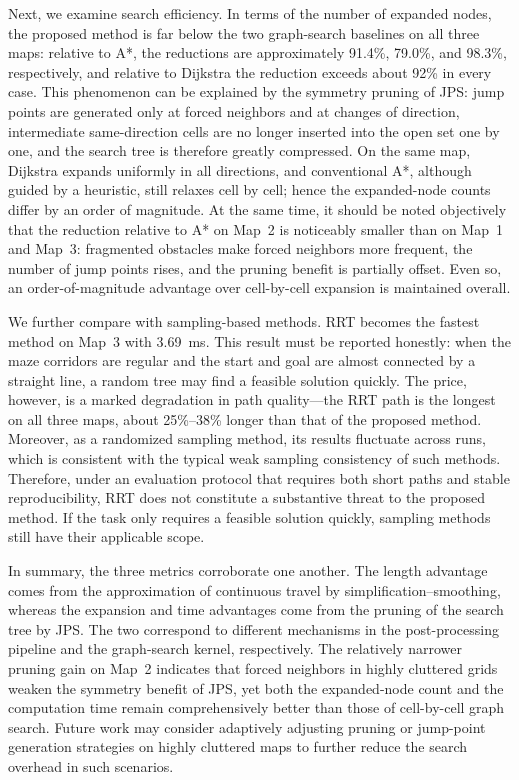 \documentclass[pdflatex,sn-basic,Numbered]{sn-jnl}
\begin{document}
Next, we examine search efficiency. In terms of the number of expanded nodes, the proposed method is far below the two graph-search baselines on all three maps: relative to A*, the reductions are approximately 91.4\%, 79.0\%, and 98.3\%, respectively, and relative to Dijkstra the reduction exceeds about 92\% in every case. This phenomenon can be explained by the symmetry pruning of JPS: jump points are generated only at forced neighbors and at changes of direction, intermediate same-direction cells are no longer inserted into the open set one by one, and the search tree is therefore greatly compressed. On the same map, Dijkstra expands uniformly in all directions, and conventional A*, although guided by a heuristic, still relaxes cell by cell; hence the expanded-node counts differ by an order of magnitude. At the same time, it should be noted objectively that the reduction relative to A* on Map~2 is noticeably smaller than on Map~1 and Map~3: fragmented obstacles make forced neighbors more frequent, the number of jump points rises, and the pruning benefit is partially offset. Even so, an order-of-magnitude advantage over cell-by-cell expansion is maintained overall.

We further compare with sampling-based methods. RRT becomes the fastest method on Map~3 with 3.69~ms. This result must be reported honestly: when the maze corridors are regular and the start and goal are almost connected by a straight line, a random tree may find a feasible solution quickly. The price, however, is a marked degradation in path quality---the RRT path is the longest on all three maps, about 25\%--38\% longer than that of the proposed method. Moreover, as a randomized sampling method, its results fluctuate across runs, which is consistent with the typical weak sampling consistency of such methods. Therefore, under an evaluation protocol that requires both short paths and stable reproducibility, RRT does not constitute a substantive threat to the proposed method. If the task only requires a feasible solution quickly, sampling methods still have their applicable scope.

In summary, the three metrics corroborate one another. The length advantage comes from the approximation of continuous travel by simplification--smoothing, whereas the expansion and time advantages come from the pruning of the search tree by JPS. The two correspond to different mechanisms in the post-processing pipeline and the graph-search kernel, respectively. The relatively narrower pruning gain on Map~2 indicates that forced neighbors in highly cluttered grids weaken the symmetry benefit of JPS, yet both the expanded-node count and the computation time remain comprehensively better than those of cell-by-cell graph search. Future work may consider adaptively adjusting pruning or jump-point generation strategies on highly cluttered maps to further reduce the search overhead in such scenarios.
\end{document}
